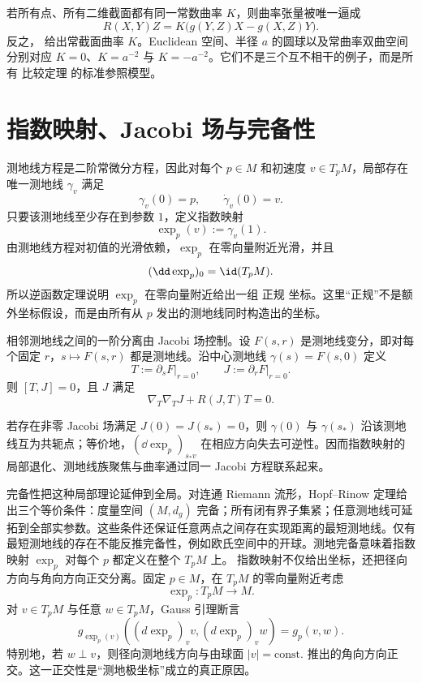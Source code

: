 若所有点、所有二维截面都有同一常数曲率 $K$，则曲率张量被唯一逼成
\begin{equation}\label{eq:math-dg-space-form-curvature}
R(X,Y)Z
=K\bigl(g(Y,Z)X-g(X,Z)Y\bigr).
\end{equation}
反之， 给出常截面曲率 $K$。Euclidean 空间、半径 $a$ 的圆球以及常曲率双曲空间分别对应 $K=0$、$K=a^{-2}$ 与 $K=-a^{-2}$。它们不是三个互不相干的例子，而是所有 比较定理 的标准参照模型。

\section{指数映射、Jacobi 场与完备性}

测地线方程是二阶常微分方程，因此对每个 $p\in M$ 和初速度 $v\in T_pM$，局部存在唯一测地线 $\gamma_v$ 满足
\[
\gamma_v(0)=p,
\qquad
\dot\gamma_v(0)=v.
\]
只要该测地线至少存在到参数 $1$，定义指数映射
\begin{equation*}\exp_p(v):=\gamma_v(1).
\end{equation*}
由测地线方程对初值的光滑依赖，$\exp_p$ 在零向量附近光滑，并且
\[
(\dd\exp_p)_0=\id(T_pM).
\]
所以逆函数定理说明 $\exp_p$ 在零向量附近给出一组 正规 坐标。这里“正规”不是额外坐标假设，而是由所有从 $p$ 发出的测地线同时构造出的坐标。

相邻测地线之间的一阶分离由 Jacobi 场控制。设 $F(s,r)$ 是测地线变分，即对每个固定 $r$，$s\mapsto F(s,r)$ 都是测地线。沿中心测地线 $\gamma(s)=F(s,0)$ 定义
\[
T:=\partial_sF\big|_{r=0},
\qquad
J:=\partial_rF\big|_{r=0}.
\]
则 $[T,J]=0$，且 $J$ 满足
\begin{equation}\label{eq:math-dg-jacobi-equation}
\boxed{\nabla_T\nabla_TJ+R(J,T)T=0.}
\end{equation}

若存在非零 Jacobi 场满足 $J(0)=J(s_*)=0$，则 $\gamma(0)$ 与 $\gamma(s_*)$ 沿该测地线互为共轭点；等价地，$(\dd\exp_p)_{s_*v}$ 在相应方向失去可逆性。因而指数映射的局部退化、测地线族聚焦与曲率通过同一 Jacobi 方程联系起来。

完备性把这种局部理论延伸到全局。对连通 Riemann 流形，Hopf--Rinow 定理给出三个等价条件：度量空间 $(M,d_g)$ 完备；所有闭有界子集紧；任意测地线可延拓到全部实参数。这些条件还保证任意两点之间存在实现距离的最短测地线。仅有最短测地线的存在不能反推完备性，例如欧氏空间中的开球。测地完备意味着指数映射 $\exp_p$ 对每个 $p$ 都定义在整个 $T_pM$ 上。
指数映射不仅给出坐标，还把径向方向与角向方向正交分离。固定 $p\in M$，在 $T_pM$ 的零向量附近考虑
\[
\exp_p:T_pM\to M.
\]
对 $v\in T_pM$ 与任意 $w\in T_pM$，Gauss 引理断言
\begin{equation}\label{eq:math-dg-gauss-lemma}
 g_{\exp_p(v)}\!\left(
 (d\exp_p)_v v,
 (d\exp_p)_v w
 \right)
 =g_p(v,w).
\end{equation}
特别地，若 $w\perp v$，则径向测地线方向与由球面 $|v|=\mathrm{const.}$ 推出的角向方向正交。这一正交性是“测地极坐标”成立的真正原因。

